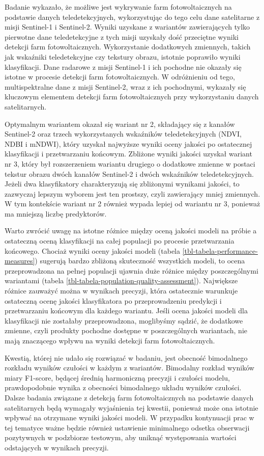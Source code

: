 \documentclass{amuthesis}
\begin{document}
Badanie wykazało, że możliwe jest wykrywanie farm fotowoltaicznych na
podstawie danych teledetekcyjnych, wykorzystując do tego celu dane
satelitarne z misji Sentinel-1 i Sentinel-2. Wyniki uzyskane z wariantów
zawierających tylko pierwotne dane teledetekcyjne z tych misji uzyskały
dość przeciętne wyniki detekcji farm fotowoltaicznych. Wykorzystanie
dodatkowych zmiennych, takich jak wskaźniki teledetekcyjne czy tekstury
obrazu, istotnie poprawiło wyniki klasyfikacji. Dane radarowe z misji
Sentinel-1 i ich pochodne nie okazały się istotne w procesie detekcji
farm fotowoltaicznych. W odróżnieniu od tego, multispektralne dane z
misji Sentinel-2, wraz z ich pochodnymi, wykazały się kluczowym
elementem detekcji farm fotowoltaicznych przy wykorzystaniu danych
satelitarnych.

Optymalnym wariantem okazał się wariant nr 2, składający się z kanałów
Sentinel-2 oraz trzech wykorzystanych wskaźników teledetekcyjnych (NDVI,
NDBI i mNDWI), który uzyskał najwyższe wyniki oceny jakości po
ostatecznej klasyfikacji i przetwarzaniu końcowym. Zbliżone wyniki
jakości uzyskał wariant nr 3, który był rozszerzeniem wariantu drugiego
o dodatkowe zmienne w postaci tekstur obrazu dwóch kanałów Sentinel-2 i
dwóch wskaźników teledetekcyjnych. Jeżeli dwa klasyfikatory
charakteryzują się zbliżonymi wynikami jakości, to zazwyczaj lepszym
wyborem jest ten prostszy, czyli zawierający mniej zmiennych. W tym
kontekście wariant nr 2 również wypada lepiej od wariantu nr 3, ponieważ
ma mniejszą liczbę predyktorów.

Warto zwrócić uwagę na istotne różnice między oceną jakości modeli na
próbie a ostateczną oceną klasyfikacji na całej populacji po procesie
przetwarzania końcowego. Chociaż wyniki oceny jakości modeli (tabela
\ref{tbl-tabela-performance-measures}) sugerują bardzo zbliżoną
skuteczność wszystkich modeli, to ocena przeprowadzona na pełnej
populacji ujawnia duże różnice między poszczególnymi wariantami (tabela
\ref{tbl-tabela-population-quality-assessment}). Największe różnice
zauważyć można w wynikach precyzji, która ostatecznie warunkuje
ostateczną ocenę jakości klasyfikatora po przeprowadzeniu predykcji i
przetwarzaniu końcowym dla każdego wariantu. Jeśli ocena jakości modeli
dla klasyfikacji nie zostałaby przeprowadzona, moglibyśmy sądzić, że
dodatkowe zmienne, czyli produkty pochodne dostępne w poszczególnych
wariantach, nie mają znaczącego wpływu na wyniki detekcji farm
fotowoltaicznych.

Kwestią, której nie udało się rozwiązać w badaniu, jest obecność
bimodalnego rozkładu wyników czułości w każdym z wariantów. Bimodalny
rozkład wyników miary F1-score, będącej średnią harmoniczną precyzji i
czułości modelu, prawdopodobnie wynika z obecności bimodalnego układu
wyników czułości. Dalsze badania związane z detekcją farm
fotowoltaicznych na podstawie danych satelitarnych będą wymagały
wyjaśnienia tej kwestii, ponieważ może ona istotnie wpływać na otrzymane
wyniki jakości modeli. W przypadku kontynuacji prac w tej tematyce ważne
będzie również ustawienie minimalnego odsetka obserwacji pozytywnych w
podzbiorze testowym, aby uniknąć występowania wartości odstających w
wynikach precyzji.
\end{document}
